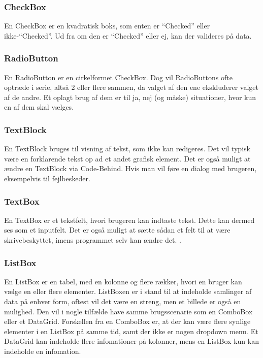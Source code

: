 \subsubsection*{CheckBox}
En CheckBox er en kvadratisk boks, som enten er ``Checked'' eller ikke-``Checked''. 
Ud fra om den er ``Checked'' eller ej, kan der valideres på data. 

\subsubsection*{RadioButton}
En RadioButton er en cirkelformet CheckBox.
Dog vil RadioButtons ofte optræde i serie, altså 2 eller flere sammen, da valget af den ene ekskluderer valget af de andre. 
Et oplagt brug af dem er til ja, nej (og måske) situationer, hvor kun en af dem skal vælges.

\subsubsection*{TextBlock}
En TextBlock bruges til visning af tekst, som ikke kan redigeres.
Det vil typisk være en forklarende tekst op ad et andet grafisk element.
Det er også muligt at ændre en TextBlock via Code-Behind. 
Hvis man vil føre en dialog med brugeren, eksempelvis til fejlbeskeder.

\subsubsection*{TextBox}
En TextBox er et tekstfelt, hvori brugeren kan indtaste tekst. 
Dette kan dermed ses som et inputfelt. 
Det er også muligt at sætte sådan et felt til at være skrivebeskyttet, imens programmet selv kan ændre det. .

\subsubsection*{ListBox}
En ListBox er en tabel, med en kolonne og flere rækker, hvori en bruger kan vælge en eller flere elementer.
ListBoxen er i stand til at indeholde samlinger af data på enhver form, oftest vil det være en streng, men et billede er også en mulighed.
Den vil i nogle tilfælde have samme brugsscenarie som en ComboBox eller et DataGrid. 
Forskellen fra en ComboBox er, at der kan være flere synlige elementer i en ListBox på samme tid, samt der ikke er nogen dropdown menu.
Et DataGrid kan indeholde flere infomationer på kolonner, mens en ListBox kun kan indeholde en infomation.

